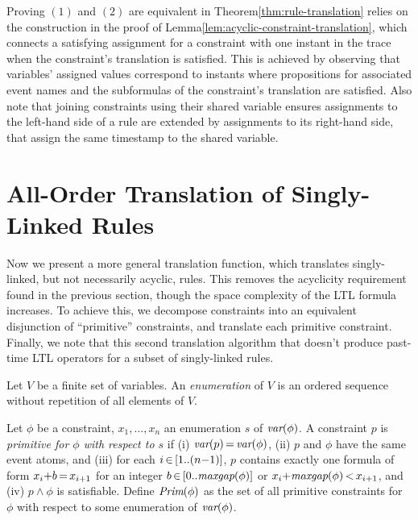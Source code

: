Proving $(1)$ and $(2)$ are equivalent in Theorem\:\ref{thm:rule-translation}
relies on the construction in the proof of
Lemma\:\ref{lem:acyclic-constraint-translation},
which connects a satisfying assignment for a constraint
with one instant in the trace when the constraint's translation is satisfied.
This is achieved by observing that variables' assigned values
correspond to instants where
propositions for associated event names
and the
subformulas of the constraint's
translation are satisfied.
Also note that
joining constraints using their shared variable
ensures assignments
to the left-hand side of a rule are extended
by assignments to its right-hand side,
that assign the same timestamp to the shared variable.


\section{All-Order Translation of Singly-Linked Rules}
\label{sec:all-order-translation}

Now we present a more general translation function,
which translates singly-linked, but not necessarily acyclic, rules.
This removes the acyclicity requirement 
found in the previous section,
though the space complexity of the LTL formula increases.
To achieve this,
we decompose constraints
into an equivalent disjunction of ``primitive'' constraints,
and translate each primitive constraint.
Finally, we note that this second translation algorithm
that doesn't produce past-time LTL operators
for a subset of singly-linked rules.

\smallskip

Let $V$ be a finite set of variables.
An {\it enumeration} of $V$
is an ordered sequence without repetition of all elements of $V$.

\begin{deff}
  Let $\phi$ be a constraint,
  $x_1,...,x_n$ an enumeration $s$ of $\textit{var}(\phi)$.
  A constraint $p$ is
  {\em primitive for $\phi$ with respect to $s$} if
  (i) $\textit{var}(p)\,{=}\,\textit{var}(\phi)$,
  (ii) $p$ and $\phi$ have the same event atoms,
  and 
  (iii) for each $i\,{\in}\,[1..(n{-}1)]$,
  $p$ contains exactly one formula of form
  $x_i{+}b\,{=}\,x_{i+1}$
  for an integer $b\,{\in}\,[0..\textit{maxgap}(\phi)]$
  or $x_i{+}\textit{maxgap}(\phi)\,{<}\,x_{i+1}$,
  and
  (iv) $p\land\phi$ is satisfiable.
  Define $\textit{Prim}(\phi)$ as the set of all primitive constraints
  for $\phi$ with respect to some enumeration of $\textit{var}(\phi)$.
\end{deff}

